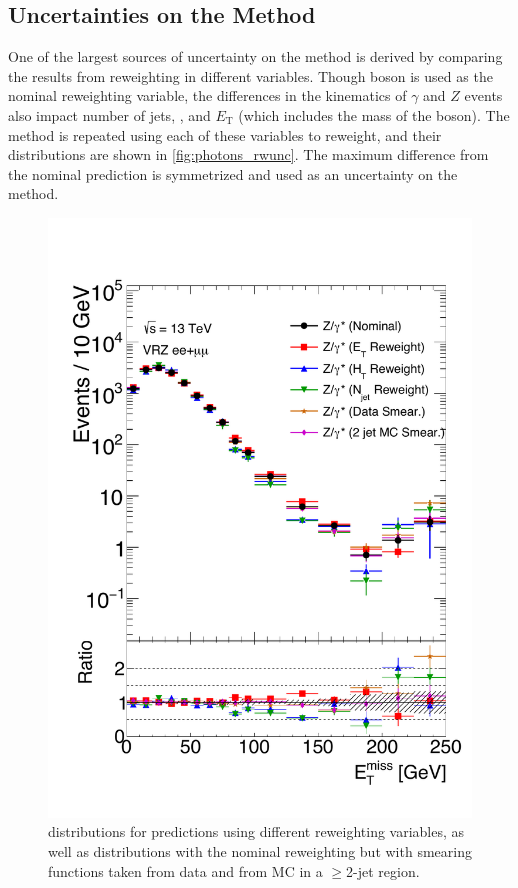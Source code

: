 
\subsection{Uncertainties on the \gjets Method}
\label{sec:unc_gjets}

One of the largest sources of uncertainty on the \gjets method is derived by comparing the results from reweighting in different variables. Though boson \pt is used as the nominal reweighting variable, the differences in the kinematics of $\gamma$ and $Z$ events also impact number of jets, \HT, and $E_{\text{T}}$ (which includes the mass of the boson). The \gjets method is repeated using each of these variables to reweight, and their \met distributions are shown in \autoref{fig:photons_rwunc}. The maximum difference from the nominal prediction is symmetrized and used as an uncertainty on the method. 

\begin{centering}
\begin{figure}[bth]
\myfloatalign
\includegraphics[width=.85\linewidth]{figures/photons/GJ_Variations_ee+mm_zmet_onz.pdf}
\caption{\met distributions for \gjets predictions using different reweighting variables, as well as distributions with the nominal reweighting but with smearing functions taken from data and from \ac{MC} in a $\geq$2-jet region.}
\label{fig:photons_rwunc}
\end{figure}
\end{centering}


